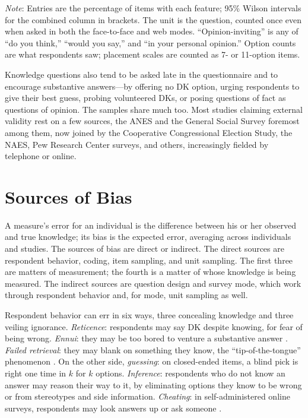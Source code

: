 \documentclass[11pt]{article}
\begin{document}
\begin{table}[htbp]
\centering\TableStyle
\caption{Design features of the knowledge items in the 2012 and 2016 ANES time series.}
\label{tab:features}
\begin{minipage}{0.9\linewidth}\footnotesize
\emph{Note}: Entries are the percentage of items with each feature; 95\% Wilson intervals for the combined column in brackets. The unit is the question, counted once even when asked in both the face-to-face and web modes. ``Opinion-inviting'' is any of ``do you think,'' ``would you say,'' and ``in your personal opinion.'' Option counts are what respondents saw; placement scales are counted as 7- or 11-option items.
\end{minipage}
\end{table}

Knowledge questions also tend to be asked late in the questionnaire and to encourage substantive answers---by offering no DK option, urging respondents to give their best guess, probing volunteered DKs, or posing questions of fact as questions of opinion. The samples share much too. Most studies claiming external validity rest on a few sources, the ANES and the General Social Survey foremost among them, now joined by the Cooperative Congressional Election Study, the NAES, Pew Research Center surveys, and others, increasingly fielded by telephone or online.

\section{Sources of Bias}

A measure's error for an individual is the difference between his or her observed and true knowledge; its bias is the expected error, averaging across individuals and studies. The sources of bias are direct or indirect. The direct sources are respondent behavior, coding, item sampling, and unit sampling. The first three are matters of measurement; the fourth is a matter of whose knowledge is being measured. The indirect sources are question design and survey mode, which work through respondent behavior and, for mode, unit sampling as well.

Respondent behavior can err in six ways, three concealing knowledge and three veiling ignorance. \emph{Reticence}: respondents may say DK despite knowing, for fear of being wrong. \emph{Ennui}: they may be too bored to venture a substantive answer \citep{mondak2001, prior2008}. \emph{Failed retrieval}: they may blank on something they know, the ``tip-of-the-tongue'' phenomenon \citep{brown1966}. On the other side, \emph{guessing}: on closed-ended items, a blind pick is right one time in $k$ for $k$ options. \emph{Inference}: respondents who do not know an answer may reason their way to it, by eliminating options they know to be wrong or from stereotypes and side information. \emph{Cheating}: in self-administered online surveys, respondents may look answers up or ask someone \citep{clifford2016, vezzoni2017}.
\end{document}

